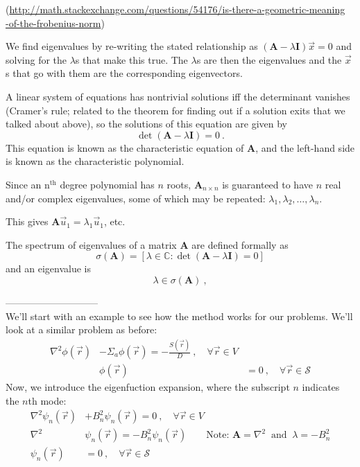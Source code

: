 \documentclass[12pt]{article}
\newcommand{\nth}{n\ensuremath{^{\text{th}}} }
\newcommand{\ve}[1]{\ensuremath{\mathbf{#1}}}
\begin{document}
(\url{http://math.stackexchange.com/questions/54176/is-there-a-geometric-meaning}\\ \url{-of-the-frobenius-norm})
 
We find eigenvalues by re-writing the stated relationship as $(\ve{A} - \lambda \ve{I})\vec{x}=0$ and solving for the $\lambda$s that make this true. The $\lambda$s are then the eigenvalues and the $\vec{x}$s that go with them are the corresponding eigenvectors. 

A linear system of equations has nontrivial solutions iff the determinant vanishes (Cramer's rule; related to the theorem for finding out if a solution exits that we talked about above), so the solutions of this equation are given by
%
\[\det(\ve{A} - \lambda \ve{I})=0 \:.\] 	
%
This equation is known as the characteristic equation of $\ve{A}$, and the left-hand side is known as the characteristic polynomial.

Since an \nth degree polynomial has $n$ roots, $\ve{A}_{n \times n}$ is guaranteed to have $n$ real and/or complex eigenvalues, some of which may be repeated: $\lambda_1, \lambda_2, \dots, \lambda_n$.

This gives $\ve{A}\vec{u}_1 = \lambda_1 \vec{u}_1$, etc.

The spectrum of eigenvalues of a matrix $\ve{A}$ are defined formally as
\[\sigma(\ve{A}) = [ \lambda \in \mathbb{C} : \det(\ve{A} - \lambda \ve{I})=0] \] 
and an eigenvalue is 
\[ \lambda \in \sigma(\ve{A})\:,\]

-----------------------------\\
We'll start with an example to see how the method works for our problems. We'll look at a similar problem as before:
\begin{align*}
\nabla^2\phi(\vec{r}) &- \Sigma_a\phi(\vec{r}) = -\frac{S(\vec{r})}{D} \:, \quad \forall \vec{r} \in V \\
& \phi(\vec{r}) &= 0\:, \quad \forall \vec{r} \in \mathcal{S}
\end{align*}
Now, we introduce the eigenfuction expansion, where the subscript $n$ indicates the $n$th mode:
\begin{align*}
\nabla^2 \psi_n (\vec{r}) &+ B_n^2 \psi_n (\vec{r}) = 0\:, \quad \forall \vec{r} \in V  \\
%
\nabla^2 &\psi_n (\vec{r}) =  -B_n^2 \psi_n (\vec{r}) \qquad \text{Note: } \ve{A} = \nabla^2\: \text{ and }\: \lambda = -B_n^2\\
\psi_n (\vec{r}) &= 0\:, \quad \forall \vec{r} \in \mathcal{S}
\end{align*}
\end{document}
